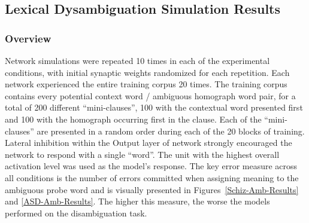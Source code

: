 \subsection{Lexical Dysambiguation Simulation Results}

\subsubsection{Overview}
Network simulations were repeated 10 times in each of the experimental conditions, with initial synaptic weights randomized for each repetition.  Each network experienced the entire training corpus 20 times.  The training corpus contains every potential context word / ambiguous homograph word pair, for a total of 200 different ``mini-clauses'', 100 with the contextual word presented first and 100 with the homograph occurring first in the clause.  Each of the ``mini-clauses'' are presented in a random order during each of the 20 blocks of training.  Lateral inhibition within the Output layer of network strongly encouraged the network to respond with a single ``word''.  The unit with the highest overall activation level was used as the model's response.  The key error measure across all conditions is the number of errors committed when assigning meaning to the ambiguous probe word and is visually presented in Figures~\ref{Schiz-Amb-Results} and \ref{ASD-Amb-Results}. The higher this measure, the worse the models performed on the disambiguation task.  


